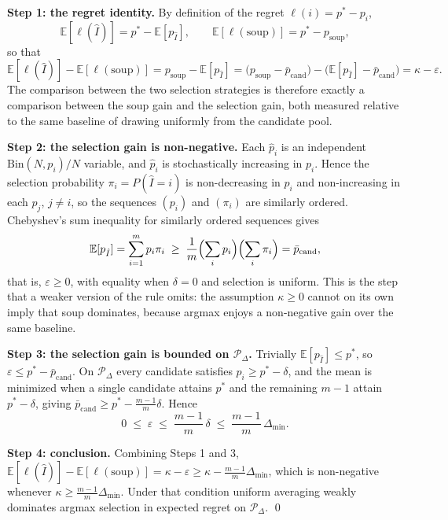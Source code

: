 \documentclass[pdflatex,sn-mathphys-ay,iicol]{sn-jnl}
\theoremstyle{thmstylethree}
\begin{document}
\begin{table}[t]
\begin{table}[t]
\medskip
\noindent\textbf{Step 1: the regret identity.} By definition of the regret $\ell(i) = p^* - p_i$,
\[
\mathbb{E}[\ell(\hat I)] = p^* - \mathbb{E}[p_{\hat I}], \qquad \mathbb{E}[\ell(\mathrm{soup})] = p^* - p_{\mathrm{soup}},
\]
so that
\[
\mathbb{E}[\ell(\hat I)] - \mathbb{E}[\ell(\mathrm{soup})]
= p_{\mathrm{soup}} - \mathbb{E}[p_{\hat I}]
= \bigl(p_{\mathrm{soup}} - \bar p_{\mathrm{cand}}\bigr) - \bigl(\mathbb{E}[p_{\hat I}] - \bar p_{\mathrm{cand}}\bigr)
= \kappa - \varepsilon .
\]
The comparison between the two selection strategies is therefore exactly a comparison between the soup gain and the selection gain, both measured relative to the same baseline of drawing uniformly from the candidate pool.

\medskip
\noindent\textbf{Step 2: the selection gain is non-negative.} Each $\hat p_i$ is an independent $\mathrm{Bin}(N,p_i)/N$ variable, and $\hat p_i$ is stochastically increasing in $p_i$. Hence the selection probability $\pi_i = P(\hat I = i)$ is non-decreasing in $p_i$ and non-increasing in each $p_j$, $j\neq i$, so the sequences $(p_i)$ and $(\pi_i)$ are similarly ordered. Chebyshev's sum inequality for similarly ordered sequences gives
\[
\mathbb{E}[p_{\hat I}] = \sum_{i=1}^m p_i \pi_i \;\geq\; \frac{1}{m}\Bigl(\sum_i p_i\Bigr)\Bigl(\sum_i \pi_i\Bigr) = \bar p_{\mathrm{cand}},
\]
that is, $\varepsilon \geq 0$, with equality when $\delta = 0$ and selection is uniform. This is the step that a weaker version of the rule omits: the assumption $\kappa\geq0$ cannot on its own imply that soup dominates, because argmax enjoys a non-negative gain over the same baseline.

\medskip
\noindent\textbf{Step 3: the selection gain is bounded on $\mathcal{P}_\Delta$.} Trivially $\mathbb{E}[p_{\hat I}] \leq p^*$, so $\varepsilon \leq p^* - \bar p_{\mathrm{cand}}$. On $\mathcal{P}_\Delta$ every candidate satisfies $p_i \geq p^* - \delta$, and the mean is minimized when a single candidate attains $p^*$ and the remaining $m-1$ attain $p^*-\delta$, giving $\bar p_{\mathrm{cand}} \geq p^* - \frac{m-1}{m}\delta$. Hence
\[
0 \;\leq\; \varepsilon \;\leq\; \frac{m-1}{m}\,\delta \;\leq\; \frac{m-1}{m}\,\Delta_{\min}.
\]

\medskip
\noindent\textbf{Step 4: conclusion.} Combining Steps 1 and 3, $\mathbb{E}[\ell(\hat I)] - \mathbb{E}[\ell(\mathrm{soup})] = \kappa - \varepsilon \geq \kappa - \frac{m-1}{m}\Delta_{\min}$, which is non-negative whenever $\kappa \geq \frac{m-1}{m}\Delta_{\min}$. Under that condition uniform averaging weakly dominates argmax selection in expected regret on $\mathcal{P}_\Delta$. \qed


\end{table}
\end{table}
\end{document}
